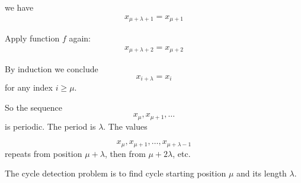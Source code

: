 \documentclass[12pt,a4paper]{article}
\begin{document}
we have
\begin{gather}
x_{\mu + \lambda + 1} = x_{\mu + 1}
\end{gather}

Apply function $ f $ again:
\begin{gather}
x_{\mu + \lambda + 2} = x_{\mu + 2}
\end{gather}

By induction we conclude
\begin{equation}\label{eq:period}
x_{i + \lambda} = x_{i}
\end{equation}
for any index $ i \geq \mu $.

So the sequence 
\begin{equation}
x_{\mu}, x_{\mu + 1}, \ldots
\end{equation}
is periodic. The period is $ \lambda $. The values 

\begin{equation}
x_{\mu}, x_{\mu+1}, \ldots, x_{\mu + \lambda - 1}
\end{equation}
repeats from position $ \mu + \lambda $, then from $ \mu + 2 \lambda $, etc.

The cycle detection problem is to find cycle starting position $ \mu $ and its length $ \lambda $.
\end{document}
